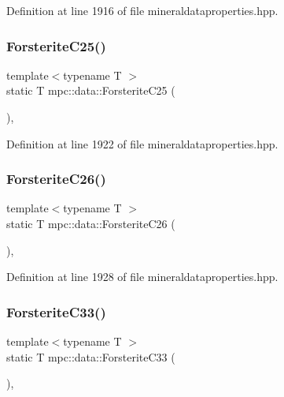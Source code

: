Definition at line 1916 of file mineraldataproperties.\+hpp.

\mbox{\label{namespacempc_1_1data_ad518da0bea516b1c6125a8fb9afb436f}} 
\subsubsection{\texorpdfstring{Forsterite\+C25()}{ForsteriteC25()}}
{\footnotesize\ttfamily template$<$typename T $>$ \\
static T mpc\+::data\+::\+Forsterite\+C25 (\begin{DoxyParamCaption}{ }\end{DoxyParamCaption})\hspace{0.3cm}{\ttfamily [inline]}, {\ttfamily [static]}}



Definition at line 1922 of file mineraldataproperties.\+hpp.

\mbox{\label{namespacempc_1_1data_a3c7eda5846e673cc90708a38b4658398}} 
\subsubsection{\texorpdfstring{Forsterite\+C26()}{ForsteriteC26()}}
{\footnotesize\ttfamily template$<$typename T $>$ \\
static T mpc\+::data\+::\+Forsterite\+C26 (\begin{DoxyParamCaption}{ }\end{DoxyParamCaption})\hspace{0.3cm}{\ttfamily [inline]}, {\ttfamily [static]}}



Definition at line 1928 of file mineraldataproperties.\+hpp.

\mbox{\label{namespacempc_1_1data_af6c287f48fac7d4f5f5f3ea6e5bff3c1}} 
\subsubsection{\texorpdfstring{Forsterite\+C33()}{ForsteriteC33()}}
{\footnotesize\ttfamily template$<$typename T $>$ \\
static T mpc\+::data\+::\+Forsterite\+C33 (\begin{DoxyParamCaption}{ }\end{DoxyParamCaption})\hspace{0.3cm}{\ttfamily [inline]}, {\ttfamily [static]}}



